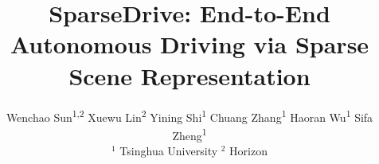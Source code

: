 \documentclass{article}
\title{SparseDrive: End-to-End Autonomous Driving via Sparse Scene Representation}
\author{%
Wenchao Sun\textsuperscript{\textnormal{1,2}} \quad
Xuewu Lin\textsuperscript{\textnormal{2}} \quad
Yining Shi\textsuperscript{\textnormal{1}} \quad
Chuang Zhang\textsuperscript{\textnormal{1}} \quad 
Haoran Wu\textsuperscript{\textnormal{1}} \quad
Sifa Zheng\textsuperscript{\textnormal{1}}
\vspace{0.2cm}\\
$^1$ Tsinghua University \quad
$^2$ Horizon
}
\begin{document}
\maketitle






\newpage
\small{


}
\newpage

% 
\end{document}
